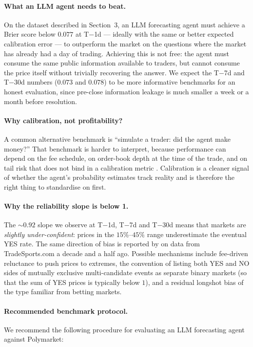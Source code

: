 \documentclass{article}
\begin{document}
\paragraph{What an LLM agent needs to beat.}
On the dataset described in Section~3, an LLM forecasting agent must
achieve a Brier score below $0.077$ at T$-$1d --- ideally with the
same or better expected calibration error --- to outperform the
market on the questions where the market has already had a day of
trading. Achieving this is not free: the agent must consume the same
public information available to traders, but cannot consume the
price itself without trivially recovering the answer. We expect the
T$-$7d and T$-$30d numbers ($0.073$ and $0.078$) to be more
informative benchmarks for an honest evaluation, since pre-close
information leakage is much smaller a week or a month before
resolution.

\paragraph{Why calibration, not profitability?}
A common alternative benchmark is ``simulate a trader: did the agent
make money?'' That benchmark is harder to interpret, because
performance can depend on the fee schedule, on order-book depth at
the time of the trade, and on tail risk that does not bind in a
calibration metric \citep{lu2025}. Calibration is a cleaner signal
of whether the agent's probability estimates track reality and is
therefore the right thing to standardise on first.

\paragraph{Why the reliability slope is below 1.}
The $\sim 0.92$ slope we observe at T$-$1d, T$-$7d and T$-$30d means
that markets are \emph{slightly under-confident}: prices in the
$15\%$--$45\%$ range underestimate the eventual YES rate. The same
direction of bias is reported by \citet{page2013} on data from
TradeSports.com a decade and a half ago. Possible mechanisms include
fee-driven reluctance to push prices to extremes, the convention of
listing both YES and NO sides of mutually exclusive multi-candidate
events as separate binary markets (so that the sum of YES prices is
typically below $1$), and a residual longshot bias of the type
familiar from betting markets.

\paragraph{Recommended benchmark protocol.}
We recommend the following procedure for evaluating an LLM
forecasting agent against Polymarket:
\end{document}
